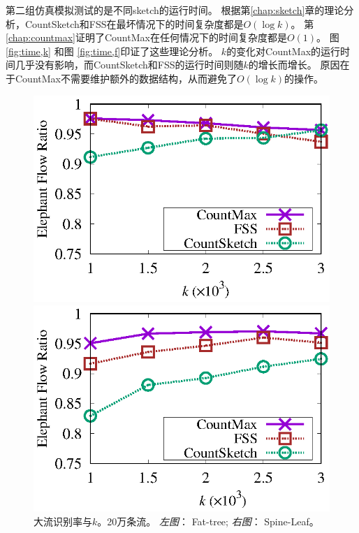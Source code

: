 第二组仿真模拟测试的是不同sketch的运行时间。
根据第\ref{chap:sketch}章的理论分析，CountSketch和FSS在最坏情况下的时间复杂度都是$O(\log{k})$。
第\ref{chap:countmax}证明了CountMax在任何情况下的时间复杂度都是$O(1)$。
图 \ref{fig:time,k} 和图 \ref{fig:time,f}印证了这些理论分析。
$k$的变化对CountMax的运行时间几乎没有影响，而CountSketch和FSS的运行时间则随$k$的增长而增长。
原因在于CountMax不需要维护额外的数据结构，从而避免了$O(\log{k})$的操作。

\begin{figure}[!t]
	\centering
	\begin{minipage}[t]{0.49\linewidth}
		\centering
		\includegraphics[width=\linewidth]{fig/ft_k_hit_200000.eps}
	\end{minipage}\vspace{-0.6em}%
	\begin{minipage}[t]{0.49\linewidth}
		\centering
		\includegraphics[width=\linewidth]{fig/hy_k_hit_200000.eps}
	\end{minipage} \vspace{-0.6em}%
	\caption{\textnormal{大流识别率与$k$。20万条流。 \textit{左图}： Fat-tree; \textit{右图}： Spine-Leaf。}}
	\label{fig:hit,k,20}
\end{figure}

